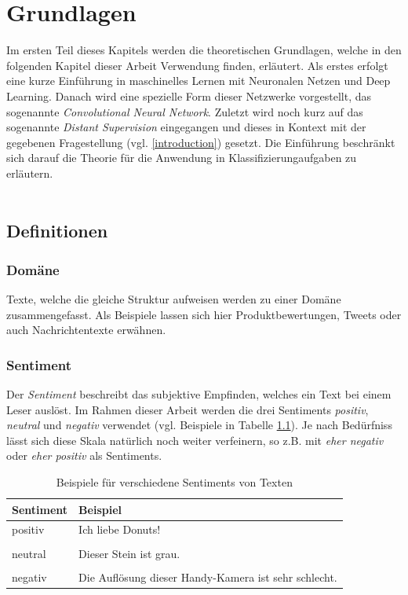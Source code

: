 \chapter{Grundlagen}
Im ersten Teil dieses Kapitels werden die theoretischen Grundlagen, welche in den folgenden Kapitel dieser Arbeit Verwendung finden, erläutert. Als erstes erfolgt eine kurze Einführung in maschinelles Lernen mit Neuronalen Netzen und Deep Learning. Danach wird eine spezielle Form dieser Netzwerke vorgestellt, das sogenannte \emph{Convolutional Neural Network}. Zuletzt wird noch kurz auf das sogenannte \emph{Distant Supervision} \cite{go2009twitter} eingegangen und dieses in Kontext mit der gegebenen Fragestellung (vgl. \ref{introduction}) gesetzt. Die Einführung beschränkt sich darauf die Theorie für die Anwendung in Klassifizierungaufgaben zu erläutern.\\\\

\section{Definitionen}

\subsection{Domäne}
Texte, welche die gleiche Struktur aufweisen werden zu einer Domäne zusammengefasst. Als Beispiele lassen sich hier Produktbewertungen, Tweets oder auch Nachrichtentexte erwähnen.

\subsection{Sentiment}
Der \emph{Sentiment} beschreibt das subjektive Empfinden, welches ein Text bei einem Leser auslöst. Im Rahmen dieser Arbeit werden  die drei Sentiments \emph{positiv}, \emph{neutral} und \emph{negativ} verwendet (vgl. Beispiele in Tabelle \ref{basics:sentiments_example_table}). Je nach Bedürfniss lässt sich diese Skala natürlich noch weiter verfeinern, so z.B. mit \emph{eher negativ} oder \emph{eher positiv} als Sentiments.\\
\begin{table}[h]
	\centering
	\begin{tabular}{@{}ll@{}}
		\toprule
		Sentiment & Beispiel\\ \midrule
		positiv & Ich liebe Donuts!\\
		&\\
		neutral & Dieser Stein ist grau.\\
		&\\
		negativ & Die Auflösung dieser Handy-Kamera ist sehr schlecht.\\
		\bottomrule
	\end{tabular}
	\caption{Beispiele für verschiedene Sentiments von Texten}
	\label{basics:sentiments_example_table}
\end{table}

